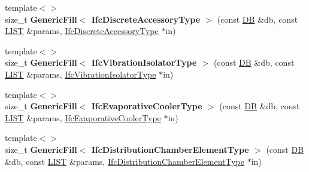 \begin{DoxyCompactItemize}
\item 
\hypertarget{namespace_assimp_1_1_s_t_e_p_ac3ff596456cc760f69187b73edd9f2c0}{{\footnotesize template$<$$>$ }\\size\+\_\+t {\bfseries Generic\+Fill$<$ Ifc\+Discrete\+Accessory\+Type $>$} (const \hyperlink{class_assimp_1_1_s_t_e_p_1_1_d_b}{D\+B} \&db, const \hyperlink{class_assimp_1_1_s_t_e_p_1_1_e_x_p_r_e_s_s_1_1_l_i_s_t}{L\+I\+S\+T} \&params, \hyperlink{struct_assimp_1_1_i_f_c_1_1_ifc_discrete_accessory_type}{Ifc\+Discrete\+Accessory\+Type} $\ast$in)}\label{namespace_assimp_1_1_s_t_e_p_ac3ff596456cc760f69187b73edd9f2c0}

\item 
\hypertarget{namespace_assimp_1_1_s_t_e_p_a95482f5f36236bf89758b30285217809}{{\footnotesize template$<$$>$ }\\size\+\_\+t {\bfseries Generic\+Fill$<$ Ifc\+Vibration\+Isolator\+Type $>$} (const \hyperlink{class_assimp_1_1_s_t_e_p_1_1_d_b}{D\+B} \&db, const \hyperlink{class_assimp_1_1_s_t_e_p_1_1_e_x_p_r_e_s_s_1_1_l_i_s_t}{L\+I\+S\+T} \&params, \hyperlink{struct_assimp_1_1_i_f_c_1_1_ifc_vibration_isolator_type}{Ifc\+Vibration\+Isolator\+Type} $\ast$in)}\label{namespace_assimp_1_1_s_t_e_p_a95482f5f36236bf89758b30285217809}

\item 
\hypertarget{namespace_assimp_1_1_s_t_e_p_ac3cfa51450d9f2763a2e7259ee0dc938}{{\footnotesize template$<$$>$ }\\size\+\_\+t {\bfseries Generic\+Fill$<$ Ifc\+Evaporative\+Cooler\+Type $>$} (const \hyperlink{class_assimp_1_1_s_t_e_p_1_1_d_b}{D\+B} \&db, const \hyperlink{class_assimp_1_1_s_t_e_p_1_1_e_x_p_r_e_s_s_1_1_l_i_s_t}{L\+I\+S\+T} \&params, \hyperlink{struct_assimp_1_1_i_f_c_1_1_ifc_evaporative_cooler_type}{Ifc\+Evaporative\+Cooler\+Type} $\ast$in)}\label{namespace_assimp_1_1_s_t_e_p_ac3cfa51450d9f2763a2e7259ee0dc938}

\item 
\hypertarget{namespace_assimp_1_1_s_t_e_p_a74ec7a00503c70792d3b9a3c2fecf6d3}{{\footnotesize template$<$$>$ }\\size\+\_\+t {\bfseries Generic\+Fill$<$ Ifc\+Distribution\+Chamber\+Element\+Type $>$} (const \hyperlink{class_assimp_1_1_s_t_e_p_1_1_d_b}{D\+B} \&db, const \hyperlink{class_assimp_1_1_s_t_e_p_1_1_e_x_p_r_e_s_s_1_1_l_i_s_t}{L\+I\+S\+T} \&params, \hyperlink{struct_assimp_1_1_i_f_c_1_1_ifc_distribution_chamber_element_type}{Ifc\+Distribution\+Chamber\+Element\+Type} $\ast$in)}\label{namespace_assimp_1_1_s_t_e_p_a74ec7a00503c70792d3b9a3c2fecf6d3}


\end{DoxyCompactItemize}
